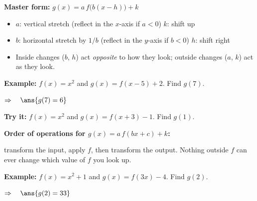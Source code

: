 \documentclass[12pt]{article}
\begin{document}


\begin{formulabox}
\textbf{Master form:} \quad $g(x) = a\,f\bigl(b(x - h)\bigr) + k$
\begin{itemize}[leftmargin=0.9cm, itemsep=0pt, topsep=2pt]
  \item $a$: vertical stretch (reflect in the $x$-axis if $a < 0$) \quad $k$: shift up
  \item $b$: horizontal stretch by $1/b$ (reflect in the $y$-axis if $b < 0$) \quad $h$: shift right
  \item Inside changes ($b$, $h$) act \emph{opposite} to how they look; outside changes ($a$, $k$) act as they look.
\end{itemize}
\end{formulabox}

\begin{examplebox}
\textbf{Example:} \quad $f(x) = x^{2}$ and $g(x) = f(x - 5) + 2$. Find $g(7)$.

$\Rightarrow\quad \ans{g(7) = 6}$
\end{examplebox}

\begin{tryitbox}
\textbf{Try it:} \quad $f(x) = x^{2}$ and $g(x) = f(x + 3) - 1$. Find $g(1)$.\\[2pt]
\end{tryitbox}


\begin{formulabox}
\textbf{Order of operations for $g(x) = a\,f(bx + c) + k$:}\par
transform the input, apply $f$, then transform the output. Nothing outside $f$ can ever change which value of $f$ you look up.
\end{formulabox}

\begin{examplebox}
\textbf{Example:} \quad $f(x) = x^{2} + 1$ and $g(x) = f(3x) - 4$. Find $g(2)$.

$\Rightarrow\quad \ans{g(2) = 33}$
\end{examplebox}
\end{document}
